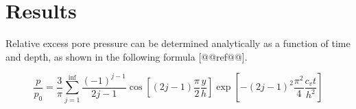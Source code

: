 \documentclass{deltares_manual_style}
\begin{document}
\section{Results}
Relative excess pore pressure can be determined analytically as a function of time and depth, as shown in the following formula [@@ref@@].

\begin{equation}\label{eq:relative_excess_pore_pressure_analytical}
\frac{p}{p_{0}} = \frac{3}{\pi}\sum_{j=1}^{\inf}\frac{(-1)^{j-1}}{2j-1}\cos[(2j-1)\frac{\pi}{2}\frac{y}{h}]\exp[-(2j-1)^{2}\frac{\pi^{2}}{4}\frac{c_{v}t}{h^{2}}]
\end{equation}






\end{document}
